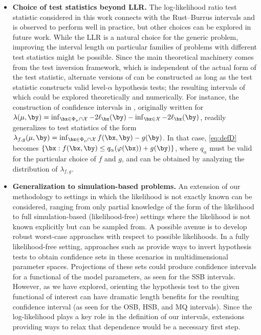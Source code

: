 \documentclass[11pt]{article}
\numberwithin{equation}{section}
\numberwithin{figure}{section}
\begin{document}
\begin{itemize}[leftmargin=7mm]
    \item \textbf{Choice of test statistics beyond LLR.} 
    The log-likelihood ratio test statistic considered in this work connects with the Rust--Burrus intervals and is observed to perform well in practice, but other choices can be explored in future work. 
    While the LLR is a natural choice for the generic problem, improving the interval length on particular families of problems with different test statistics might be possible. 
    Since the main theoretical machinery comes from the test inversion framework, which is independent of the actual form of the test statistic, alternate versions of  can be constructed as long as the test statistic constructs valid level-$\alpha$ hypothesis tests; the resulting intervals of which could be explored theoretically and numerically.
    For instance, the construction of confidence intervals in , originally written for $\lambda(\mu, \by) = \inf_{\bx \in \Phi_\mu \cap \mathcal{X}} -2\ell_{\bx}(\by) - \inf_{\bx \in \mathcal{X}} -2 \ell_{\bx}(\by)$, readily generalizes to test statistics of the form $\lambda_{f,g}(\mu, \by) = \inf_{\bx \in \Phi_\mu \cap \mathcal{X}} f(\bx, \by) - g(\by)$. 
    In that case, \eqref{eq:defD} becomes $\{\bx: f(\bx, \by) \leq q_\alpha(\varphi(\bx)) + g(\by)\}$, where $q_\alpha$ must be valid for the particular choice of $f$ and $g$, and can be obtained by analyzing the distribution of $\lambda_{f,g}$.
        
    \item \textbf{Generalization to simulation-based problems.}
    An extension of our methodology to settings in which the likelihood is not exactly known can be considered, ranging from only partial knowledge of the form of the likelihood to full simulation-based (likelihood-free) settings where the likelihood is not known explicitly but can be sampled from. 
    A possible avenue is to develop robust worst-case approaches with respect to possible likelihoods. 
    In a fully likelihood-free setting, approaches such as \cite{dalmasso2020confidence, heinrich2022learning, waldo,dalmasso2021likelihood} provide ways to invert hypothesis tests to obtain confidence sets in these scenarios in multidimensional parameter spaces. 
    Projections of these sets could produce confidence intervals for a functional of the model parameters, as seen for the SSB intervals. 
    However, as we have explored, orienting the hypothesis test to the given functional of interest can have dramatic length benefits for the resulting confidence interval (as seen for the OSB, HSB, and MQ intervals). 
    Since the log-likelihood plays a key role in the definition of our intervals, extensions providing ways to relax that dependence would be a necessary first step.
\end{itemize}
\end{document}
